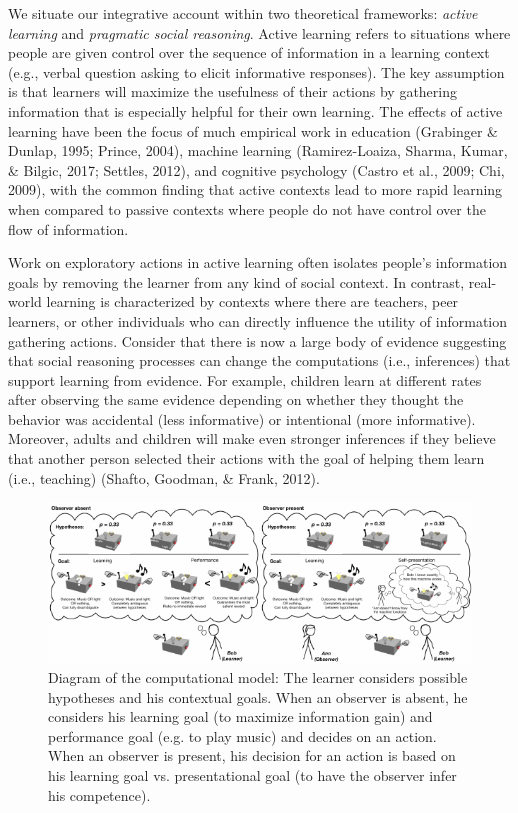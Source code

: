 \documentclass[10pt, letterpaper]{article}
\newenvironment{CodeChunk}{}{}
\begin{document}
We situate our integrative account within two theoretical frameworks:
\emph{active learning} and \emph{pragmatic social reasoning}. Active
learning refers to situations where people are given control over the
sequence of information in a learning context (e.g., verbal question
asking to elicit informative responses). The key assumption is that
learners will maximize the usefulness of their actions by gathering
information that is especially helpful for their own learning. The
effects of active learning have been the focus of much empirical work in
education (Grabinger \& Dunlap, 1995; Prince, 2004), machine learning
(Ramirez-Loaiza, Sharma, Kumar, \& Bilgic, 2017; Settles, 2012), and
cognitive psychology (Castro et al., 2009; Chi, 2009), with the common
finding that active contexts lead to more rapid learning when compared
to passive contexts where people do not have control over the flow of
information.

Work on exploratory actions in active learning often isolates people's
information goals by removing the learner from any kind of social
context. In contrast, real-world learning is characterized by contexts
where there are teachers, peer learners, or other individuals who can
directly influence the utility of information gathering actions.
Consider that there is now a large body of evidence suggesting that
social reasoning processes can change the computations (i.e.,
inferences) that support learning from evidence. For example, children
learn at different rates after observing the same evidence depending on
whether they thought the behavior was accidental (less informative) or
intentional (more informative). Moreover, adults and children will make
even stronger inferences if they believe that another person selected
their actions with the goal of helping them learn (i.e., teaching)
(Shafto, Goodman, \& Frank, 2012).

\begin{CodeChunk}
\begin{figure}[tb]

{\centering \includegraphics[width=1\linewidth]{figs/model_diagram-1} 

}

\caption[Diagram of the computational model]{Diagram of the computational model: The learner considers possible hypotheses and his contextual goals. When an observer is absent, he considers his learning goal (to maximize information gain) and performance goal (e.g. to play music) and decides on an action. When an observer is present, his decision for an action is based on his learning goal vs. presentational goal (to have the observer infer his competence).}\label{fig:model_diagram}
\end{figure}
\end{CodeChunk}
\end{document}
